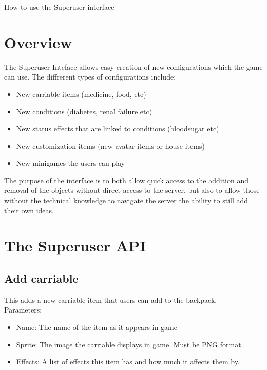 \documentclass[a4paper,12pt]{article}
\begin{document}
\begin{center}
{\Huge How to use the Superuser interface}
\end{center}


\section{Overview}

The Superuser Inteface allows easy creation of new configurations which the game can use.
The diffrerent types of configurations include:
\begin{itemize}
	\item New carriable items (medicine, food, etc)
	\item New conditions (diabetes, renal failure etc)
	\item New status effects that are linked to conditions (bloodsugar etc)
	\item New customization items (new avatar items or house items)
	\item New minigames the users can play
\end{itemize}

The purpose of the interface is to both allow quick access to the addition and removal of the objects without
direct access to the server, but also to allow those without the technical knowledge to navigate the server the
ability to still add their own ideas.


\section{The Superuser API}
\subsection*{Add carriable}
This adds a new carriable item that users can add to the backpack.\\
Parameters:
\begin{itemize}
	\setlength\itemsep{0em}
	\item Name: The name of the item as it appears in game
	\item Sprite: The image the carriable displays in game. Must be PNG format.
	\item Effects: A list of effects this item has and how much it affects them by.
\end{itemize}
\end{document}
